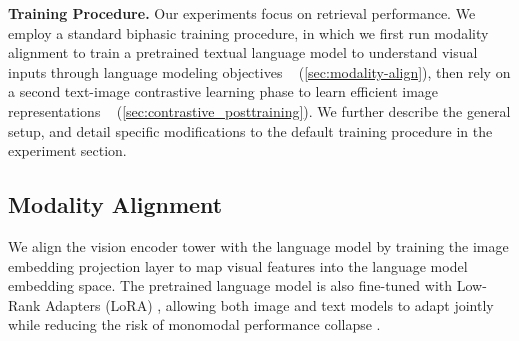 



\noindent\textbf{Training Procedure.} Our experiments focus on retrieval performance. We employ a standard biphasic training procedure, in which we first run modality alignment to train a pretrained textual language model to understand visual inputs through language modeling objectives  ~ (\autoref{sec:modality-align}), then rely on a second text-image contrastive learning phase to learn efficient image representations ~ (\autoref{sec:contrastive_posttraining}). We further describe the general setup, and detail specific modifications to the default training procedure in the experiment section.

\subsection{Modality Alignment}
\label{sec:modality-align}
We align the vision encoder tower with the language model by training the image embedding projection layer to map visual features into the language model embedding space. The pretrained language model is also fine-tuned with Low-Rank Adapters (LoRA) , allowing both image and text models to adapt jointly while reducing the risk of monomodal performance collapse .

